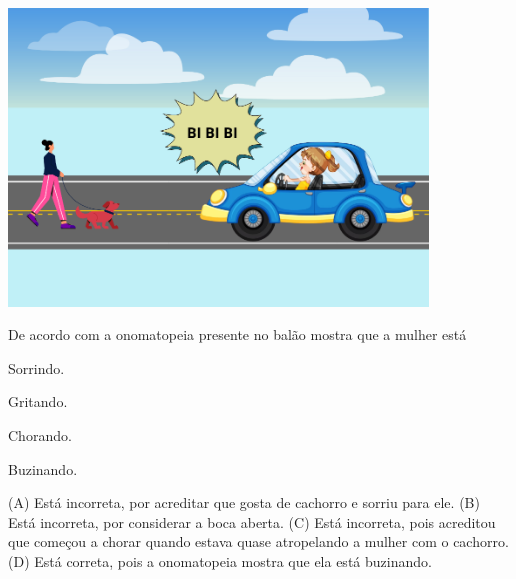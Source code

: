 \includegraphics[width=4.38462in,height=3.11119in]{media/image182.png}


De acordo com a onomatopeia presente no balão mostra que a mulher está

\begin{minipage}{.5\textwidth}
\begin{escolha}
\item Sorrindo.

\item Gritando.

\item Chorando.

\item Buzinando.
\end{escolha}
\end{minipage}

(A) Está incorreta, por acreditar que gosta de cachorro e sorriu para ele.
(B) Está incorreta, por considerar a boca aberta.
(C) Está incorreta, pois acreditou que começou a chorar quando estava quase atropelando a mulher com o cachorro.
(D) Está correta, pois a onomatopeia mostra que ela está buzinando.

